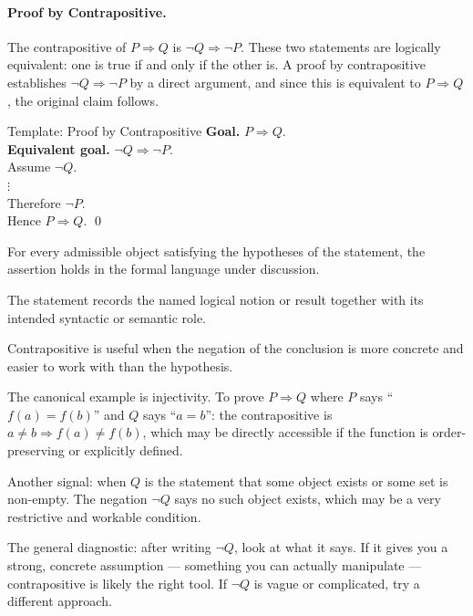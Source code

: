 \paragraph{Proof by Contrapositive.}

The contrapositive of $P \Rightarrow Q$ is $\neg Q \Rightarrow \neg P$.
These two statements are logically equivalent: one is true if and only
if the other is. A proof by contrapositive establishes
$\neg Q \Rightarrow \neg P$ by a direct argument, and since this is
equivalent to $P \Rightarrow Q$, the original claim follows.

\begin{propositionbox}{Template: Proof by Contrapositive}
\textbf{Goal.} $P \Rightarrow Q$.\\
\textbf{Equivalent goal.} $\neg Q \Rightarrow \neg P$.\\[4pt]
Assume $\neg Q$.\\
$\vdots$ \\
Therefore $\neg P$.\\
Hence $P \Rightarrow Q$. \qed
\end{propositionbox}
\begin{remark*}
For every admissible object satisfying the hypotheses of the statement, the
assertion holds in the formal language under discussion.
\end{remark*}

\begin{remark*}[Interpretation]
The statement records the named logical notion or result together with its
intended syntactic or semantic role.
\end{remark*}


\begin{remark}
Contrapositive is useful when the negation of the conclusion is more
concrete and easier to work with than the hypothesis.

The canonical example is injectivity. To prove $P \Rightarrow Q$ where
$P$ says ``$f(a) = f(b)$'' and $Q$ says ``$a = b$'': the contrapositive
is $a \neq b \Rightarrow f(a) \neq f(b)$, which may be directly
accessible if the function is order-preserving or explicitly defined.

Another signal: when $Q$ is the statement that some object exists or
some set is non-empty. The negation $\neg Q$ says no such object
exists, which may be a very restrictive and workable condition.

The general diagnostic: after writing $\neg Q$, look at what it says.
If it gives you a strong, concrete assumption --- something you can
actually manipulate --- contrapositive is likely the right tool.
If $\neg Q$ is vague or complicated, try a different approach.
\end{remark}

